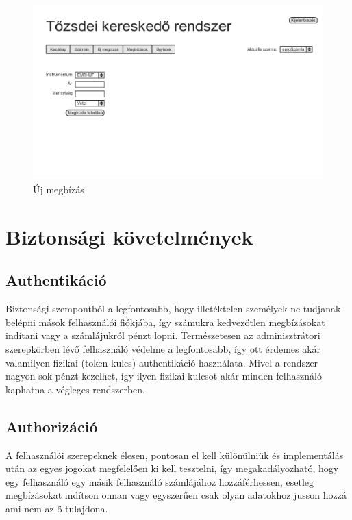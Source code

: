 \begin{figure}[!ht]
\centering
\includegraphics[width=150mm, keepaspectratio]{figures/user_1/uj_megbizas.png}
\caption{Új megbízás}
\label{fig:haromreteg}
\end{figure}

\section{Biztonsági követelmények}\label{sect:security}

\subsection{Authentikáció}
Biztonsági szempontból a legfontosabb, hogy illetéktelen személyek ne tudjanak belépni mások felhasználói fiókjába, így számukra kedvezőtlen megbízásokat indítani vagy a számlájukról pénzt lopni. Természetesen az adminisztrátori szerepkörben lévő felhasználó védelme a legfontosabb, így ott érdemes akár valamilyen fizikai (token kulcs) authentikáció használata. Mivel a rendszer nagyon sok pénzt kezelhet, így ilyen fizikai kulcsot akár minden felhasználó kaphatna a végleges rendszerben.

\subsection{Authorizáció}
A felhasználói szerepeknek élesen, pontosan el kell különülniük és implementálás után az egyes jogokat megfelelően ki kell tesztelni, így megakadályozható, hogy egy felhasználó egy másik felhasználó számlájához hozzáférhessen, esetleg megbízásokat indítson onnan vagy egyszerűen csak olyan adatokhoz jusson hozzá ami nem az ő tulajdona.

